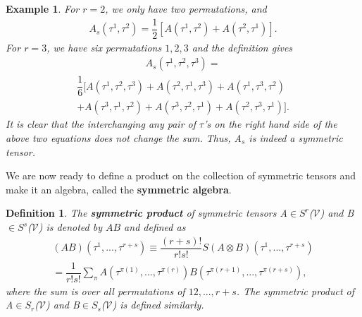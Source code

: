 \documentclass[12pt,a4paper]{article}
\newtheorem{defn}[thm]{Definition}
\newtheorem{exmp}{Example}[section]
\begin{document}
\begin{exmp}
For $r = 2$, we only have two permutations, and
 \begin{align*}
A_s(\tau^1,\tau^2) = \dfrac{1}{2} [A(\tau^1,\tau^2) + A(\tau^2,\tau^1)].
\end{align*}
For $r = 3$, we have six permutations $1, 2, 3$ and the definition gives
\begin{align*}
A_s(\tau^1,\tau^2,\tau^3) = 
\end{align*}
\begin{align*}
 \dfrac{1}{6}[A(\tau^1,\tau^2,\tau^3) + A(\tau^2,\tau^1,\tau^3) + A(\tau^1,\tau^3,\tau^2) \\+ A(\tau^3,\tau^1,\tau^2) + A(\tau^3,\tau^2,\tau^1) + A(\tau^2,\tau^3,\tau^1)].     
\end{align*}
It is clear that the interchanging any pair of $\tau$'s on the right hand side of the above  two equations does not change the sum. Thus, A$_s$ is indeed a symmetric tensor.
\end{exmp}
\hspace{1cm} We are now ready to define a product on the collection of symmetric tensors and make it an algebra, called the \textbf{symmetric algebra}.
\begin{defn}
The \textbf{symmetric product} of symmetric tensors A$\in S^r$($\mathcal{V}$) and B$\in S^s$($\mathcal{V}$) is denoted by $AB$ and defined as\\
\begin{align*}
(AB)(\tau^1,...,\tau^{r+s})\equiv \dfrac{(r+s)!}{r!s!}S(A\otimes B)(\tau^1,...,\tau^{r+s})\\
= \dfrac{1}{r!s!}\sum_{\pi}A(\tau^{\pi(1)},...,\tau^{\pi(r)})B(\tau^{\pi(r+1)},...,\tau^{\pi(r+s)}), 
\end{align*} 
where the sum is over all permutations of $1 2,...,r+s$. The symmetric product of A$\in S_{r}$($\mathcal{V}$) and B$\in S_{s}$($\mathcal{V}$) is defined similarly.
\end{defn}
\end{document}
